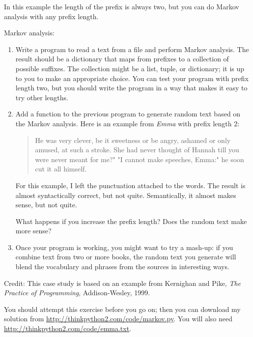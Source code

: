 \documentclass[10pt]{book}
\begin{document}
In this example the length of the prefix is always two, but
you can do Markov analysis with any prefix length.

\begin{exercise}

Markov analysis:

\begin{enumerate}

\item Write a program to read a text from a file and perform Markov
analysis.  The result should be a dictionary that maps from
prefixes to a collection of possible suffixes.  The collection
might be a list, tuple, or dictionary; it is up to you to make
an appropriate choice.  You can test your program with prefix
length two, but you should write the program in a way that makes
it easy to try other lengths.

\item Add a function to the previous program to generate random text
based on the Markov analysis.  Here is an example from {\em Emma}
with prefix length 2:

\begin{quote}
He was very clever, be it sweetness or be angry, ashamed or only
amused, at such a stroke. She had never thought of Hannah till you
were never meant for me?" "I cannot make speeches, Emma:" he soon cut
it all himself.
\end{quote}

For this example, I left the punctuation attached to the words.
The result is almost syntactically correct, but not quite.
Semantically, it almost makes sense, but not quite.

What happens if you increase the prefix length?  Does the random
text make more sense?

\item Once your program is working, you might want to try a mash-up:
if you combine text from two or more books, the random
text you generate will blend the vocabulary and phrases from
the sources in interesting ways.

\end{enumerate}

Credit: This case study is based on an example from Kernighan and
Pike, {\em The Practice of Programming}, Addison-Wesley, 1999.

\end{exercise}

You should attempt this exercise before you go on; then you can
download my solution from \url{http://thinkpython2.com/code/markov.py}.
You will also need \url{http://thinkpython2.com/code/emma.txt}.
\end{document}
